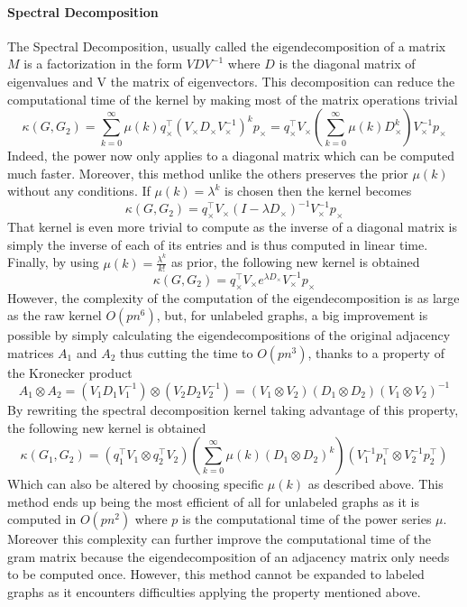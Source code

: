 \documentclass{article}
\theoremstyle{definition}
\begin{document}
\paragraph{Spectral Decomposition}
The Spectral Decomposition, usually called the eigendecomposition of a matrix $M$ is a factorization in the form $VDV^{-1}$ where $D$ is the diagonal matrix of eigenvalues and V the matrix of eigenvectors. This decomposition can reduce the computational time of the kernel by making most of the matrix operations trivial
\begin{equation}
	\kappa(G,G_2)=\sum\limits_{k=0}^{\infty}\mu(k)q_{\times}^{\top}(V_{\times}D_{\times}V_{\times}^{-1})^{k}p_{\times} = q_{\times}^{\top}V_{\times}\left(\sum\limits_{k=0}^{\infty}\mu(k)D_{\times}^{k}\right)V_{\times}^{-1}p_{\times}
\end{equation}
Indeed, the power now only applies to a diagonal matrix which can be computed much faster. Moreover, this method unlike the others preserves the prior $\mu(k)$ without any conditions. If $\mu(k)=\lambda^k$ is chosen then the kernel becomes
\begin{equation}
	\kappa(G,G_2)=q_{\times}^{\top}V_{\times}(I-\lambda D_{\times})^{-1}V_{\times}^{-1}p_{\times}
\end{equation}
That kernel is even more trivial to compute as the inverse of a diagonal matrix is simply the inverse of each of its entries and is thus computed in linear time. Finally, by using $\mu(k)=\frac{\lambda^k}{k!}$  as prior, the following new kernel is obtained
\begin{equation}
	\kappa(G,G_2)=q_{\times}^{\top}V_{\times}{e^{\lambda D_{\times}}}V_{\times}^{-1}p_{\times}
\end{equation}
However, the complexity of the computation of the eigendecomposition is as large as the raw kernel $O(pn^6)$, but, for unlabeled graphs, a big improvement is possible by simply calculating the eigendecompositions of the original adjacency matrices $A_1$ and $A_2$ thus cutting the time to $O(pn^3)$, thanks to a property of the Kronecker product
\begin{equation}
	A_1 \otimes A_2=(V_{1}D_{1}V_{1}^{-1})\otimes(V_{2}D_{2}V_{2}^{-1})=(V_1\otimes V_2)(D_1 \otimes D_2)(V_1 \otimes V_2)^{-1}
\end{equation}
By rewriting the spectral decomposition kernel taking advantage of this property, the following new kernel is obtained
\begin{equation}
	\kappa(G_1,G_2)=(q_{1}^{\top}V_{1}\otimes q_{2}^{\top}V_{2})(\sum\limits_{k=0}^{\infty}\mu(k)(D_{1}\otimes D_{2})^k)(V_{1}^{-1}p_{1}^{\top}\otimes V_{2}^{-1}p_{2}^{\top})
\end{equation}
Which can also be altered by choosing specific $\mu(k)$ as described above. This method ends up being the most efficient of all for unlabeled graphs as it is computed in $O(pn^2)$ where $p$ is the computational time of the power series $\mu$. Moreover this complexity can further improve the computational time of the gram matrix because the eigendecomposition of an adjacency matrix only needs to be computed once. However, this method cannot be expanded to labeled graphs as it encounters difficulties applying the property mentioned above.
\end{document}
